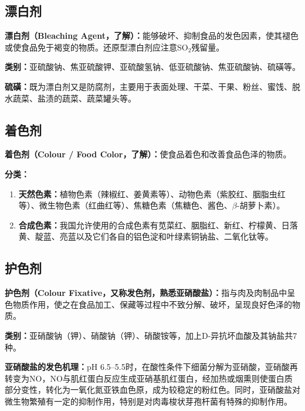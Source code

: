 \subsection{漂白剂}

\begin{tipbox}
\textbf{漂白剂（Bleaching Agent，了解）：}能够破坏、抑制食品的发色因素，使其褪色或使食品免于褐变的物质。还原型漂白剂应注意SO$_2$残留量。

\textbf{类别：}亚硫酸钠、焦亚硫酸钾、亚硫酸氢钠、低亚硫酸钠、焦亚硫酸钠、硫磺等。

\textbf{硫磺：}既为漂白剂又是防腐剂，主要用于表面处理、干菜、干果、粉丝、蜜饯、脱水蔬菜、盐渍的蔬菜、蔬菜罐头等。
\end{tipbox}

\subsection{着色剂}

\begin{tipbox}
\textbf{着色剂（Colour / Food Color，了解）：}使食品着色和改善食品色泽的物质。

\textbf{分类：}
\begin{enumerate}[leftmargin=*]
    \item \textbf{天然色素：}植物色素（辣椒红、姜黄素等）、动物色素（紫胶红、胭脂虫红等）、微生物色素（红曲红等）、焦糖色素（焦糖色、酱色、$\beta$-胡萝卜素）。
    \item \textbf{合成色素：}我国允许使用的合成色素有苋菜红、胭脂红、新红、柠檬黄、日落黄、靛蓝、亮蓝以及它们各自的铝色淀和叶绿素铜钠盐、二氧化钛等。
\end{enumerate}
\end{tipbox}

\subsection{护色剂}

\begin{tipbox}
\textbf{护色剂（Colour Fixative，又称发色剂，熟悉亚硝酸盐）：}指与肉及肉制品中呈色物质作用，使之在食品加工、保藏等过程中不致分解、破坏，呈现良好色泽的物质。

\textbf{类别：}亚硝酸钠（钾）、硝酸钠（钾）、硝酸铵等，加上D-异抗坏血酸及其钠盐共7种。
\end{tipbox}

\begin{tipbox}
\textbf{亚硝酸盐的发色机理：}pH 6.5--5.5时，在酸性条件下细菌分解为亚硝酸，亚硝酸再转变为NO，NO与肌红蛋白反应生成亚硝基肌红蛋白，经加热或烟熏则使蛋白质部分变性，转化为一氧化氮亚铁血色原，成为较稳定的粉红色。同时，亚硝酸盐对微生物繁殖有一定的抑制作用，特别是对肉毒梭状芽孢杆菌有特殊的抑制作用。
\end{tipbox}

